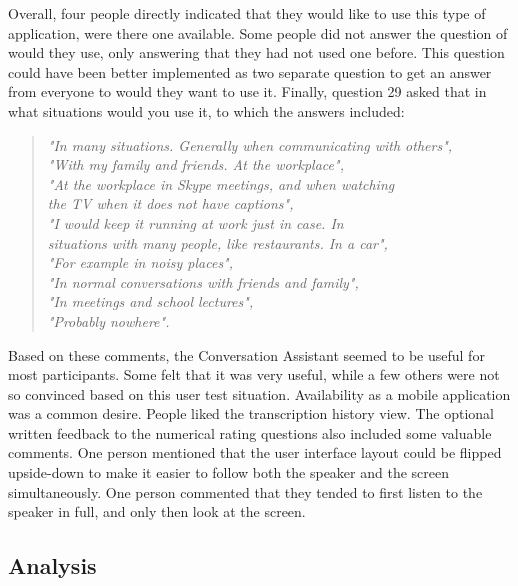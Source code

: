 \documentclass[english, 12pt, a4paper, pdftex, elec, utf8]{aaltothesis}
\renewcommand{\baselinestretch}{1.02}
\begin{document}
\vspace{2mm}
Overall, four people directly indicated that they would like to use this type of application, were there one available. Some people did not answer the question of would they use, only answering that they had not used one before. This question could have been better implemented as two separate question to get an answer from everyone to would they want to use it. Finally, question 29 asked that in what situations would you use it, to which the answers included:
\begin{quote}
	\centering
	\renewcommand{\baselinestretch}{1.5}
	\textit{
		"In many situations. Generally when communicating with others", \\
		"With my family and friends. At the workplace", \\
		"At the workplace in Skype meetings, and when watching \\ \vspace{-2.5mm} the TV when it does not have captions", \\
		"I would keep it running at work just in case. In  \\ \vspace{-2.5mm} situations with many people, like restaurants. In a car", \\
		"For example in noisy places", \\
		"In normal conversations with friends and family", \\
		"In meetings and school lectures", \\
		\vspace{2mm}
		"Probably nowhere".} \\
\end{quote}
Based on these comments, the Conversation Assistant seemed to be useful for most participants. Some felt that it was very useful, while a few others were not so convinced based on this user test situation. Availability as a mobile application was a common desire. People liked the transcription history view. The optional written feedback to the numerical rating questions also included some valuable comments. One person mentioned that the user interface layout could be flipped upside-down to make it easier to follow both the speaker and the screen simultaneously. One person commented that they tended to first listen to the speaker in full, and only then look at the screen.

\subsection{Analysis} \label{sec:analysis}
\end{document}
